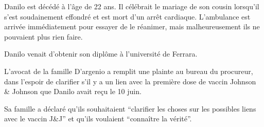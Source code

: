 Danilo est décédé à l'âge de 22 ans. Il célébrait le mariage de son cousin
lorsqu'il s'est soudainement effondré et est mort d'un arrêt
cardiaque. L'ambulance est arrivée immédiatement pour essayer de le réanimer,
mais malheureusement ils ne pouvaient plus rien faire.

Danilo venait d'obtenir son diplôme à l'université de Ferrara.

L'avocat de la famille D'argenio a remplit une plainte au bureau du procureur,
dans l'espoir de clarifier s'il y a un lien avec la première dose de vaccin
Johnson \& Johnson que Danilo avait reçu le 10 juin.

Sa famille a déclaré qu'ils souhaitaient “clarifier les choses sur les possibles
liens avec le vaccin J\&J” et qu'ils voulaient “connaître la vérité”.

